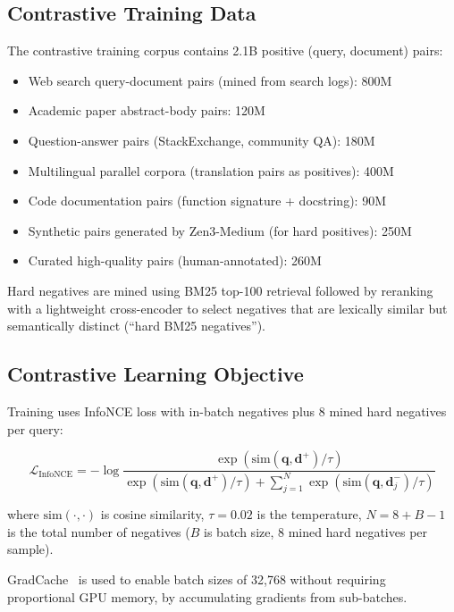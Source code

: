 \documentclass[11pt,a4paper]{article}
\begin{document}
\subsection{Contrastive Training Data}

The contrastive training corpus contains 2.1B positive (query, document) pairs:

\begin{itemize}
\item Web search query-document pairs (mined from search logs): 800M
\item Academic paper abstract-body pairs: 120M
\item Question-answer pairs (StackExchange, community QA): 180M
\item Multilingual parallel corpora (translation pairs as positives): 400M
\item Code documentation pairs (function signature + docstring): 90M
\item Synthetic pairs generated by Zen3-Medium (for hard positives): 250M
\item Curated high-quality pairs (human-annotated): 260M
\end{itemize}

Hard negatives are mined using BM25 top-100 retrieval followed by reranking with
a lightweight cross-encoder to select negatives that are lexically similar but
semantically distinct (``hard BM25 negatives'').

\subsection{Contrastive Learning Objective}

Training uses InfoNCE loss with in-batch negatives plus 8 mined hard negatives per query:

\begin{equation}
\mathcal{L}_{\text{InfoNCE}} = -\log \frac{\exp(\text{sim}(\mathbf{q}, \mathbf{d}^+) / \tau)}{\exp(\text{sim}(\mathbf{q}, \mathbf{d}^+) / \tau) + \sum_{j=1}^{N} \exp(\text{sim}(\mathbf{q}, \mathbf{d}^-_j) / \tau)}
\end{equation}

where $\text{sim}(\cdot, \cdot)$ is cosine similarity, $\tau = 0.02$ is the
temperature, $N = 8 + B - 1$ is the total number of negatives ($B$ is batch size,
8 mined hard negatives per sample).

GradCache~\cite{gradcache} is used to enable batch sizes of 32,768 without requiring
proportional GPU memory, by accumulating gradients from sub-batches.
\end{document}
